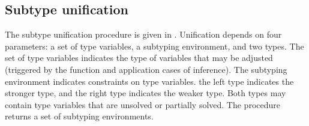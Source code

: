 \documentclass[acmsmall]{acmart}
\theoremstyle{definition}
\begin{document}




\subsection{Subtype unification}
The subtype unification procedure is given in .
Unification depends on four parameters: a set of type variables, a subtyping environment, and two types.
The set of type variables indicates the type of variables that may be adjusted 
(triggered by the function and application cases of inference). 
The subtyping environment indicates constraints on type variables.
the left type indicates the stronger type, and the right type indicates the weaker type.
Both types may contain type variables that are unsolved or partially solved.
The procedure returns a set of subtyping environments.
\end{document}
